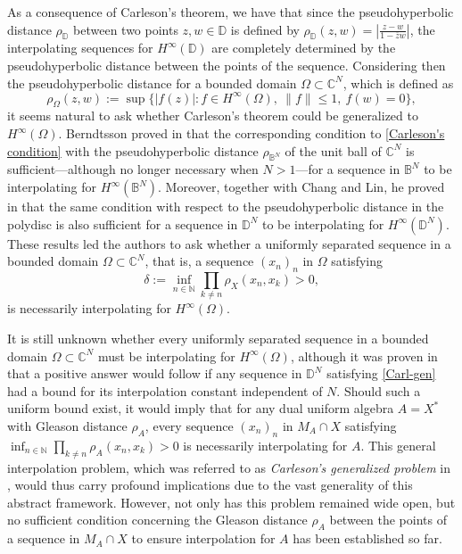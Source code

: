 \documentclass[preprint,12pt,number]{elsarticle}
\begin{document}
As a consequence of Carleson's theorem, we have that since the pseudohyperbolic distance $\rho_\mathbb{D}$ between two points $z,w\in \mathbb{D}$ is defined by $\rho_\mathbb{D}(z,w)=\left\vert{} \frac{z-w}{1-\overline{z}w}\right\vert{}$, the interpolating sequences for $H^\infty(\mathbb{D})$ are completely determined by the pseudohyperbolic distance between the points of the sequence. Considering then the pseudohyperbolic distance for a bounded domain $\Omega \subset \mathbb{C}^N$, which is defined as\begin{equation}\label{Dist-gleason}\rho_\Omega(z,w):=\sup\{|f(z)|:f\in H^\infty(\Omega),\ \lVert f \rVert\leq 1,\ f(w)=0 \},\end{equation}it seems natural to ask whether Carleson's theorem could be generalized to $H^\infty(\Omega)$. Berndtsson proved in \cite{Berndtsson1985} that the corresponding condition to \eqref{Carleson's condition} with the pseudohyperbolic distance $\rho_{\mathbb{B}^N}$ of the unit ball of $\mathbb{C}^N$ is sufficient---although no longer necessary when $N>1$---for a sequence in $\mathbb{B}^N$ to be interpolating for $H^\infty(\mathbb{B}^N)$. Moreover, together with Chang and Lin, he proved in \cite{BerndtssonChangLin1987} that the same condition with respect to the pseudohyperbolic distance in the polydisc is also sufficient for a sequence in $\mathbb{D}^N$ to be interpolating for $H^\infty(\mathbb{D}^N)$. These results led the authors to ask whether a uniformly separated sequence in a bounded domain $\Omega\subset\mathbb{C}^N$, that is, a sequence $(x_n)_n$ in $\Omega$ satisfying\begin{equation}\label{Carl-gen}\delta:= \inf_{n\in\mathbb{N}}\prod_{k\neq n}\rho_X(x_n,x_k)>0,\end{equation}is necessarily interpolating for $H^\infty(\Omega)$.

It is still unknown whether every uniformly separated sequence in a bounded domain $\Omega \subset \mathbb{C}^N$ must be interpolating for $H^\infty(\Omega)$, although it was proven in \cite{BerndtssonChangLin1987}  that a positive answer would follow if any sequence in $\mathbb{D}^N$ satisfying \eqref{Carl-gen} had a bound for its interpolation constant independent of $N$. Should such a uniform bound exist, it would imply that for any dual uniform algebra $A=X^*$ with Gleason distance $\rho_A$, every sequence $(x_n)_n$ in $M_A\cap X$ satisfying $\inf_{n\in\mathbb{N}}\prod_{k\neq n}\rho_A(x_n,x_k)>0$ is necessarily interpolating for $A$. This general interpolation problem, which was referred to as \emph{Carleson's generalized problem} in \cite{GalindoLindstromMiralles2009}, would thus carry profound implications due to the vast generality of this abstract framework. However, not only has this problem remained wide open, but no sufficient condition concerning the Gleason distance $\rho_A$ between the points of a sequence in $M_A\cap X$ to ensure interpolation for $A$ has been established so far.
\end{document}
